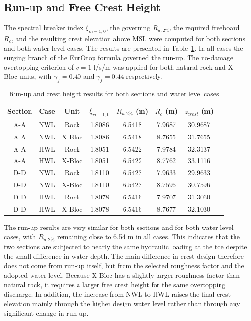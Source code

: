 \documentclass[a4paper, 11pt]{article}
\begin{document}
\subsection{Run-up and Free Crest Height}
\hspace{0.5cm}The spectral breaker index $\xi_{m-1,0}$, the governing $R_{u,2\%}$, the required freeboard $R_{c}$, and the resulting crest elevation above MSL were computed for both sections and both water level cases. The results are presented in Table~\ref{tab:runup}. In all cases the surging branch of the EurOtop formula governed the run-up. The no-damage overtopping criterion of $q = 1$ l/s/m was applied for both natural rock and X-Bloc units, with $\gamma_{f} = 0.40$ and $\gamma_{f} = 0.44$ respectively.

\begin{table}[H]
\centering
\caption{Run-up and crest height results for both sections and water level cases}
\label{tab:runup}
\begin{tabular}{cccccccc}
\hline
Section & Case & Unit & $\xi_{m-1,0}$ & $R_{u,2\%}$ (m) & $R_{c}$ (m) & $z_{crest}$ (m) \\
\hline
A-A & NWL & Rock   & 1.8086 & 6.5418 & 7.9687 & 30.9687 \\
A-A & NWL & X-Bloc & 1.8086 & 6.5418 & 8.7655 & 31.7655 \\
A-A & HWL & Rock   & 1.8051 & 6.5422 & 7.9784 & 32.3137 \\
A-A & HWL & X-Bloc & 1.8051 & 6.5422 & 8.7762 & 33.1116 \\
D-D & NWL & Rock   & 1.8110 & 6.5423 & 7.9633 & 29.9633 \\
D-D & NWL & X-Bloc & 1.8110 & 6.5423 & 8.7596 & 30.7596 \\
D-D & HWL & Rock   & 1.8078 & 6.5416 & 7.9707 & 31.3060 \\
D-D & HWL & X-Bloc & 1.8078 & 6.5416 & 8.7677 & 32.1030 \\
\hline
\end{tabular}
\end{table}

\hspace{0.5cm}The run-up results are very similar for both sections and for both water level cases, with $R_{u,2\%}$ remaining close to 6.54 m in all cases. This indicates that the two sections are subjected to nearly the same hydraulic loading at the toe despite the small difference in water depth. The main difference in crest design therefore does not come from run-up itself, but from the selected roughness factor and the adopted water level. Because X-Bloc has a slightly larger roughness factor than natural rock, it requires a larger free crest height for the same overtopping discharge. In addition, the increase from NWL to HWL raises the final crest elevation mainly through the higher design water level rather than through any significant change in run-up.
\end{document}
